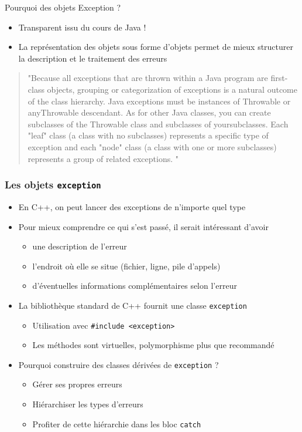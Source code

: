\begin{frame}{Pourquoi des objets Exception ?}
\begin{itemize}
	\item \alert{Transparent issu du cours de Java !}
	\item La représentation des objets sous forme d'objets permet de mieux structurer la description et le traitement des erreurs
\end{itemize}
{\small \begin{quote}
"Because all exceptions that are thrown within a Java program 
are first-class objects, grouping or categorization of exceptions 
is a natural outcome of the class hierarchy.  Java exceptions 
must be instances of Throwable or anyThrowable descendant. 
As for other Java classes, you can create subclasses of the 
Throwable class and subclasses of yoursubclasses. 
Each "leaf" class (a class with no subclasses) represents 
a specific type of exception and each "node" class (a class with 
one or more subclasses) represents a group of 
related exceptions. "
\end{quote}}
\end{frame} 

\begin{frame}[fragile]\frametitle{Les objets \texttt{exception}}
\begin{itemize}
\item En C++, on peut lancer des exceptions de n'importe quel type
\item Pour mieux comprendre ce qui s'est passé, il serait intéressant d'avoir
\begin{itemize}
\item une description de l'erreur
\item l'endroit où elle se situe (fichier, ligne, pile d'appels)
\item d'éventuelles informations complémentaires selon l'erreur
\end{itemize}
\item La bibliothèque standard de C++ fournit une classe \verb|exception|
\begin{itemize}
\item Utilisation avec \verb|#include <exception>|
\item Les méthodes sont virtuelles, polymorphisme plus que recommandé
\end{itemize}
\item Pourquoi construire des classes dérivées de \verb|exception| ?
\begin{itemize}
\item Gérer ses propres erreurs
\item Hiérarchiser les types d'erreurs
\item Profiter de cette hiérarchie dans les bloc \verb|catch|
\end{itemize}
\end{itemize}
\end{frame}

